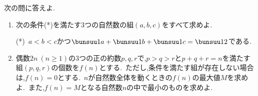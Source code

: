 \begin{problem}
次の問に答えよ.
  \begin{enumerate}
    \item 次の条件(*)を満たす3つの自然数の組$(a,b,c)$をすべて求めよ.
    \begin{center}
      (*)\ $a < b <c$かつ$\bunsuu1{a}+\bunsuu1{b}+\bunsuu1{c}=\bunsuu12$である.
    \end{center}
    \item 偶数$2n\ (n \geq 1)$の3つの正の約数$p,q,r$で,$p > q > r$と$p+q+r=n$を満たす組$(p,q,r)$の個数を$f(n)$とする.\, ただし,条件を満たす組が存在しない場合は,$f(n)=0$とする.\, $n$が自然数全体を動くときの$f(n)$の最大値$M$を求めよ.\, また,$f(n)=M$となる自然数$n$の中で最小のものを求めよ.
  \end{enumerate}
\end{problem}
